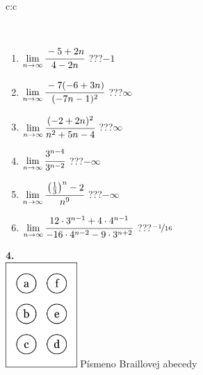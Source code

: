 \documentclass[10pt]{report}
\begin{document}
\begin{tabular}{c:c}
\begin{minipage}[c][104.5mm][t]{0.5\linewidth}
\begin{center}
\begin{minipage}{0.95\linewidth}
\begin{center}
\end{center}
\end{minipage}
\\[1mm]
\begin{minipage}{0.79\linewidth}
\begin{center}
\begin{varwidth}{\linewidth}
\begin{enumerate}
\normalsize
\item $\lim\limits_{n\to\infty}\cfrac{-5+2n}{4-2n}$\quad \dotfill\; ???\;\dotfill \quad $-1$
\item $\lim\limits_{n\to\infty}\cfrac{-7(-6+3n)}{(-7n-1)^2}$\quad \dotfill\; ???\;\dotfill \quad $\infty$
\item $\lim\limits_{n\to\infty}\cfrac{(-2+2n)^2}{n^2+5n-4}$\quad \dotfill\; ???\;\dotfill \quad $\infty$
\item $\lim\limits_{n\to\infty}\cfrac{3^{n-4}}{3^{n-2}}$\quad \dotfill\; ???\;\dotfill \quad $-\infty$
\item $\lim\limits_{n\to\infty}\cfrac{\left(\frac{1}{3}\right)^n -2}{n^{9}}$\quad \dotfill\; ???\;\dotfill \quad $-\infty$
\item $\lim\limits_{n\to\infty}\cfrac{12\cdot 3^{n-1}+4\cdot 4^{n-1}}{-16\cdot 4^{n-2}-9\cdot 3^{n+2}}$\quad \dotfill\; ???\;\dotfill \quad $\nicefrac{-1}{16}$
\end{enumerate}
\end{varwidth}
\end{center}
\end{minipage}
\begin{minipage}{0.20\linewidth}
\begin{center}
{\Huge\bfseries 4.} \\[2mm]
\includegraphics[height=40mm]{../images/braille.png}
{\small Písmeno Braillovej abecedy}
\end{center}
\end{minipage}
\end{center}
\end{minipage}
%
\end{tabular}
\newpage
\thispagestyle{empty}
\end{document}

